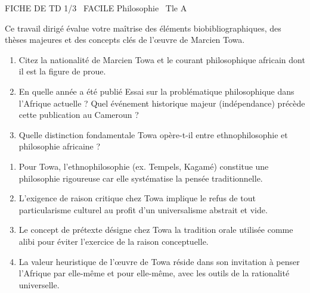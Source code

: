 \documentclass[11pt]{article}
\begin{document}
\begin{tcolorbox}[enhanced,colback=popink,colframe=popink,arc=10pt,boxrule=0pt,left=12pt,right=12pt,top=9pt,bottom=9pt]
{\color{white}\popxbold\small FICHE DE TD 1/3 \textbullet\ FACILE \hfill Philosophie \textbullet\ Tle A\par}
\end{tcolorbox}
\vspace{4pt}
Ce travail dirigé évalue votre maîtrise des éléments biobibliographiques, des thèses majeures et des concepts clés de l'œuvre de Marcien Towa.

\begin{exercice}
\begin{enumerate}
    \item Citez la nationalité de Marcien Towa et le courant philosophique africain dont il est la figure de proue.
    \item En quelle année a été publié \og Essai sur la problématique philosophique dans l'Afrique actuelle \fg{} ? Quel événement historique majeur (indépendance) précède cette publication au Cameroun ?
    \item Quelle distinction fondamentale Towa opère-t-il entre \og ethnophilosophie \fg{} et \og philosophie africaine \fg{} ?
\end{enumerate}
\end{exercice}

\begin{exercice}
\begin{enumerate}
    \item Pour Towa, l'ethnophilosophie (ex. Tempels, Kagamé) constitue une philosophie rigoureuse car elle systématise la pensée traditionnelle.
    \item L'exigence de \og raison critique \fg{} chez Towa implique le refus de tout particularisme culturel au profit d'un universalisme abstrait et vide.
    \item Le concept de \og prétexte \fg{} désigne chez Towa la tradition orale utilisée comme alibi pour éviter l'exercice de la raison conceptuelle.
    \item La \og valeur heuristique \fg{} de l'œuvre de Towa réside dans son invitation à penser l'Afrique par elle-même et pour elle-même, avec les outils de la rationalité universelle.
\end{enumerate}
\end{exercice}
\end{document}
